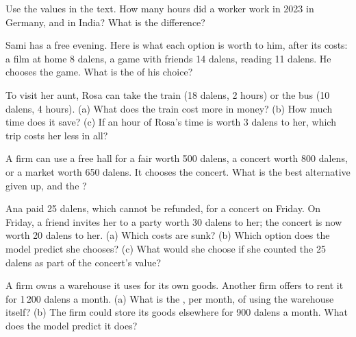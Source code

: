 \begin{exercise}[$\star$]\label{exo:g7:scarcity-and-opportunity-cost:1}
Use the values in the text. How many hours did a worker work in 2023 in Germany, and
in India? What is the difference?
\end{exercise}

\begin{exercise}[$\star$]\label{exo:g7:scarcity-and-opportunity-cost:2}
Sami has a free evening. Here is what each option is worth to him, after its
costs: a film at home 8 dalens, a game with friends 14 dalens, reading 11 dalens. He
chooses the game. What is the  of his choice?
\end{exercise}

\begin{exercise}[$\star$]\label{exo:g7:scarcity-and-opportunity-cost:3}
To visit her aunt, Rosa can take the train (18 dalens, 2 hours) or the bus (10 dalens,
4 hours). (a) What does the train cost more in money? (b) How much time does it save?
(c) If an hour of Rosa's time is worth 3 dalens to her, which trip costs her less in
all?
\end{exercise}

\begin{exercise}[$\star$]\label{exo:g7:scarcity-and-opportunity-cost:4}
A firm can use a free hall for a fair worth 500 dalens, a concert worth 800 dalens, or
a market worth 650 dalens. It chooses the concert. What is the best alternative given
up, and the ?
\end{exercise}

\begin{exercise}[$\star\star$]\label{exo:g7:scarcity-and-opportunity-cost:5}
Ana paid 25 dalens, which cannot be refunded, for a concert on Friday. On Friday, a
friend invites her to a party worth 30 dalens to her; the concert is now worth 20
dalens to her. (a) Which costs are sunk? (b) Which option does the model predict she
chooses? (c) What would she choose if she counted the 25 dalens as part of the
concert's value?
\end{exercise}

\begin{exercise}[$\star\star$]\label{exo:g7:scarcity-and-opportunity-cost:6}
A firm owns a warehouse it uses for its own goods. Another firm offers to rent it for
1\,200 dalens a month. (a) What is the , per month, of using the
warehouse itself? (b) The firm could store its goods elsewhere for 900 dalens a month.
What does the model predict it does?
\end{exercise}

